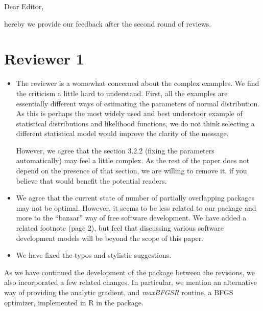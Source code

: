 \documentclass[a4paper]{article}
\begin{document}
Dear Editor,

hereby we provide our feedback after the second round of reviews.

\section*{Reviewer 1}

\begin{itemize}
\item The reviewer is a womewhat concerned about the complex examples.
  We find the criticism a little hard to understand.  First, all the
  examples are essentially different ways of estimating the parameters
  of normal distribution.  As this is perhaps the most widely used and
  best understoor example of statistical distributions and likelihood
  functions, we do not think selecting a different statistical model
  would improve the clarity of the message.

  However, we agree that the section 3.2.2 (fixing the parameters
  automatically) may feel a little complex.  As the rest of the paper
  does not depend on the presence of that section, we are willing to
  remove it, if you believe that would benefit the potential readers.
\item We agree that the current state of number of partially
  overlapping packages may not be optimal.  However, it seems to be
  less related to our package and more to the ``bazaar'' way of free
  software development.  We have added a related footnote (page 2),
  but feel that discussing various software development models will be
  beyond the scope of this paper.
\item We have fixed the typos and stylistic suggestions.
\end{itemize}

As we have continued the development of the package between the
revisions, we also incorporated a few related changes.  In particular,
we mention an alternative way of providing the analytic gradient, and
\emph{maxBFGSR} routine, a BFGS optimizer, implemented in R in the
package. 
\end{document}
